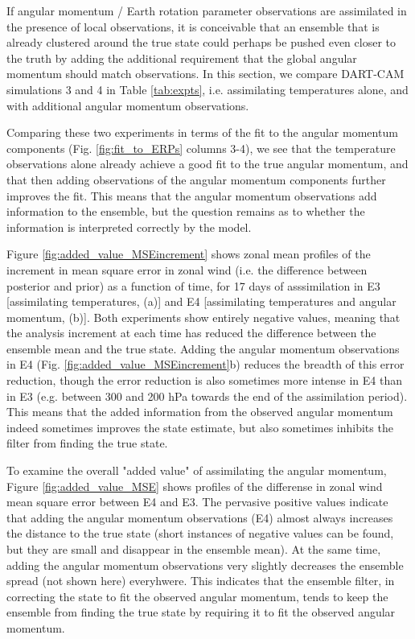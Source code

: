 If angular momentum / Earth rotation parameter observations are assimilated in the presence of local observations, it is conceivable that an ensemble that is already clustered around the true state could perhaps be pushed even closer to the truth by adding the additional requirement that the global angular momentum should match observations. 
In this section, we compare DART-CAM simulations 3 and 4 in Table \ref{tab:expts}, i.e. assimilating temperatures alone, and with additional angular momentum observations.

Comparing these two experiments in terms of the fit to the angular momentum components (Fig. \ref{fig:fit_to_ERPs} columns 3-4), we see that the temperature observations alone already achieve a good fit to the true angular momentum, and that 
then adding observations of the angular momentum components further improves the fit.  
This means that the angular momentum observations add information to the ensemble, but the question remains as to whether the information is interpreted correctly by the model.

Figure \ref{fig:added_value_MSEincrement} shows zonal mean profiles of the increment in mean square error in zonal wind (i.e. the difference between posterior and prior) as a function of time, for 17 days of asssimilation in E3 [assimilating temperatures, (a)] and E4 [assimilating temperatures and angular momentum, (b)].  
Both experiments show entirely negative values, meaning that the analysis increment at each time has reduced the difference between the ensemble mean and the true state.  
Adding the angular momentum observations in E4 (Fig. \ref{fig:added_value_MSEincrement}b) reduces the breadth of this error reduction, though the error reduction is also sometimes more intense in E4 than in E3 (e.g. between 300 and 200 hPa towards the end of the assimilation period). 
This means that the added information from the observed angular momentum indeed sometimes improves the state estimate, but also sometimes inhibits the filter from finding the true state. 

To examine the overall "added value" of assimilating the angular momentum, Figure \ref{fig:added_value_MSE} shows profiles of the differense in zonal wind mean square error between E4 and E3. 
The pervasive positive values indicate that adding the angular momentum observations (E4) almost always increases the distance to the true state (short instances of negative values can be found, but they are small and disappear in the ensemble mean). 
At the same time, adding the angular momentum observations very slightly decreases the ensemble spread (not shown here) everyhwere.  
This indicates that the ensemble filter, in correcting the state to fit the observed angular momentum, tends to keep the ensemble from finding the true state by requiring it to fit the observed angular momentum.  

